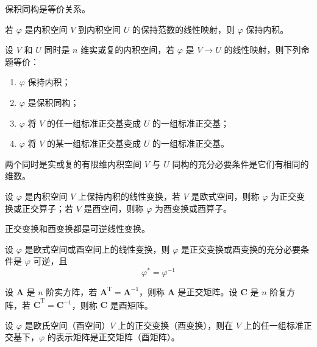 \begin{remark}
  保积同构是等价关系。
\end{remark}

\begin{proposition}
  若 $\varphi$ 是内积空间 $V$ 到内积空间 $U$ 的保持范数的线性映射，则 $\varphi$ 保持内积。
\end{proposition}

\begin{theorem}
  设 $V$ 和 $U$ 同时是 $n$ 维实或复的内积空间，若 $\varphi$ 是 $V \to U$ 的线性映射，则下列命题等价：
  \begin{enumerate}
    \item $\varphi$ 保持内积；
    \item $\varphi$ 是保积同构；
    \item $\varphi$ 将 $V$ 的任一组标准正交基变成 $U$ 的一组标准正交基；
    \item $\varphi$ 将 $V$ 的某一组标准正交基变成 $U$ 的一组标准正交基。
  \end{enumerate}
\end{theorem}

\begin{corollary}
  两个同时是实或复的有限维内积空间 $V$ 与 $U$ 同构的充分必要条件是它们有相同的维数。
\end{corollary}

\begin{definition}
  设 $\varphi$ 是内积空间 $V$ 上保持内积的线性变换，若 $V$ 是欧式空间，则称 $\varphi$ 为正交变换或正交算子；若 $V$ 是酉空间，则称 $\varphi$ 为酉变换或酉算子。
\end{definition}

\begin{remark}
  正交变换和酉变换都是可逆线性变换。
\end{remark}

\begin{theorem}
  设 $\varphi$ 是欧式空间或酉空间上的线性变换，则 $\varphi$ 是正交变换或酉变换的充分必要条件是 $\varphi$ 可逆，且
  \[
      \varphi^{*} = \varphi^{-1}
  \]
\end{theorem}

\begin{definition}
  设 $\bm{A}$ 是 $n$ 阶实方阵，若 $\bm{A}^{\mathrm{T}} = \bm{A}^{-1}$，则称 $\bm{A}$ 是正交矩阵。设 $\bm{C}$ 是 $n$ 阶复方阵，若 $\overline{\bm{C}}^{\mathrm{T}} = \bm{C}^{-1}$，则称 $\bm{C}$ 是酉矩阵。
\end{definition}

\begin{theorem}
  设 $\varphi$ 是欧氏空间（酉空间）$V$ 上的正交变换（酉变换），则在 $V$ 上的任一组标准正交基下，$\varphi$ 的表示矩阵是正交矩阵（酉矩阵）。
\end{theorem}

